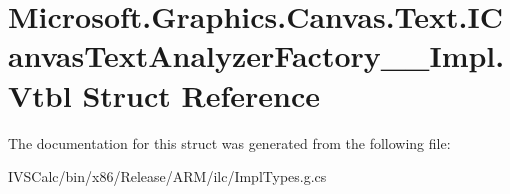 \hypertarget{struct_microsoft_1_1_graphics_1_1_canvas_1_1_text_1_1_i_canvas_text_analyzer_factory_____impl_1_1_vtbl}{}\section{Microsoft.\+Graphics.\+Canvas.\+Text.\+I\+Canvas\+Text\+Analyzer\+Factory\+\_\+\+\_\+\+Impl.\+Vtbl Struct Reference}
\label{struct_microsoft_1_1_graphics_1_1_canvas_1_1_text_1_1_i_canvas_text_analyzer_factory_____impl_1_1_vtbl}


The documentation for this struct was generated from the following file\+:\begin{DoxyCompactItemize}
\item 
I\+V\+S\+Calc/bin/x86/\+Release/\+A\+R\+M/ilc/Impl\+Types.\+g.\+cs\end{DoxyCompactItemize}
